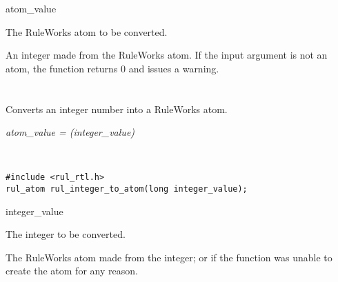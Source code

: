 \begin{argument}
\item[atom\_value]

  The RuleWorks  atom to be converted.
\end{argument}

\ReturnValue  

An integer made from the RuleWorks atom. If the input argument is not
an  atom, the function returns 0 and issues a warning.

\begin{seealso}


\end{seealso}

\section*{}

Converts an integer number into a RuleWorks  atom.

\Syntax

\it{atom\_value} = (\it{integer\_value})

\begin{args}
   \\
\end{args}

\CBinding
\begin{verbatim}
#include <rul_rtl.h>
rul_atom rul_integer_to_atom(long integer_value);
\end{verbatim}

\begin{argument}
\item[integer\_value]

  The integer to be converted.
\end{argument}

\ReturnValue

The RuleWorks  atom made from the integer; or
 if the function was unable to create the
atom for any reason.

\begin{seealso}

\end{seealso}

